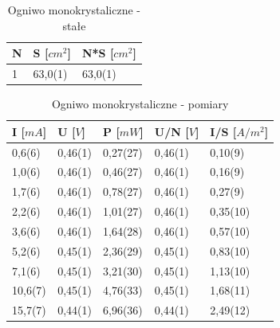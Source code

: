 \documentclass[12pt,a4paper]{article}
\begin{document}
\newpage

\begin{table}[H]
\centering
\caption{Ogniwo monokrystaliczne - stałe}
\label{monostale}
\begin{tabular}{|p{2cm}|p{2cm}|p{2cm}|}
\hline
N & S {[}$cm^2${]} & N*S {[}$cm^2${]}   \\
\hline
1 & 63,0(1) & 63,0(1) \\
\hline
\end{tabular}
\end{table}

\begin{table}[H]
\centering
\caption{Ogniwo monokrystaliczne - pomiary}
\label{mono}
\begin{tabular}{|p{2cm}|p{2cm}|p{2cm}|p{2cm}|p{2cm}|}
\hline
I {[}$mA${]}	& U {[}$V${]}	& P  {[}$mW${]}	& U/N {[}$V${]} & I/S {[}$A/m^2${]} \\ 
\hline
0,6(6)			& 0,46(1)		& 0,27(27)		& 0,46(1)		& 0,10(9)\\
1,0(6)			& 0,46(1)		& 0,46(27)		& 0,46(1)		& 0,16(9)\\
1,7(6)			& 0,46(1)		& 0,78(27)		& 0,46(1)		& 0,27(9)\\
2,2(6)			& 0,46(1)		& 1,01(27)		& 0,46(1)		& 0,35(10)\\
3,6(6)			& 0,46(1)		& 1,64(28)		& 0,46(1)		& 0,57(10)\\
5,2(6)			& 0,45(1)		& 2,36(29)		& 0,45(1)		& 0,83(10)\\
7,1(6)			& 0,45(1)		& 3,21(30)		& 0,45(1)		& 1,13(10)\\
10,6(7)			& 0,45(1)		& 4,76(33)		& 0,45(1)		& 1,68(11)\\
15,7(7)			& 0,44(1)		& 6,96(36)		& 0,44(1)		& 2,49(12)\\
\hline
\end{tabular}
\end{table}
\end{document}
